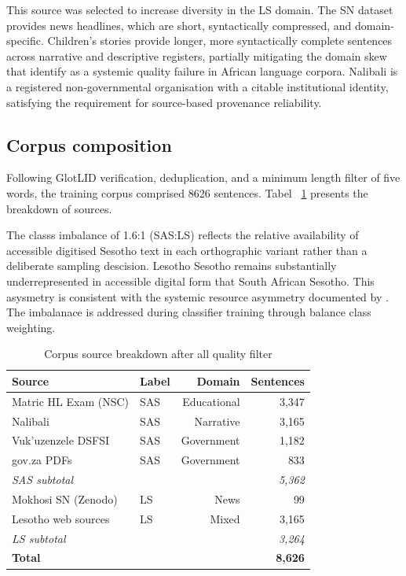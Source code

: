 \documentclass[11pt,a4paper]{article}
\begin{document}
This source was selected to increase diversity in the LS domain. The SN dataset
provides news headlines, which are short, syntactically compressed, and
domain-specific. Children's stories provide longer, more syntactically complete
sentences across narrative and descriptive registers, partially mitigating the
domain skew that \citet{kwon2026afroscope} identify as a systemic quality
failure in African language corpora. Nalibali is a registered non-governmental
organisation with a citable institutional identity, satisfying the requirement
for source-based provenance reliability.

\subsection{Corpus composition}

Following GlotLID verification, deduplication, and a minimum length filter of five words, the training corpus comprised 8626 sentences. Tabel ~\ref{tab:corpus_sources_meth} presents the breakdown of sources.

The classs imbalance of 1.6:1 (SAS:LS) reflects the relative availability of accessible digitised Sesotho text in each orthographic variant rather than a deliberate sampling descision. Lesotho Sesotho remains substantially underrepresented in accessible digital form that South African Sesotho. This asysmetry is consistent with the systemic resource asymmetry documented by \citet{mokhosi2024sesotho}. The imbalanace is addressed during classifier training through balance class weighting.

\begin{table}[ht]
    \centering
    \begin{tabular}{llrr}
    \toprule
    \textbf{Source} & \textbf{Label} & \textbf{Domain} & \textbf{Sentences} \\
    \midrule
    Matric HL Exam (NSC) & SAS & Educational  & 3,347 \\
    Nalibali             & SAS & Narrative    & 3,165 \\
    Vuk'uzenzele DSFSI   & SAS & Government   & 1,182 \\
    gov.za PDFs          & SAS & Government   &   833 \\
    \midrule
    \textit{SAS subtotal} &    &              & \textit{5,362} \\
    \midrule
    Mokhosi SN (Zenodo)  & LS  & News         &    99 \\
    Lesotho web sources  & LS  & Mixed        & 3,165 \\
    \midrule
    \textit{LS subtotal} &     &              & \textit{3,264} \\
    \midrule
    \textbf{Total}       &     &              & \textbf{8,626} \\
    \bottomrule
    \end{tabular}
    \caption{Corpus source breakdown after all quality filter}
    \label{tab:corpus_sources_meth}
\end{table}
\end{document}

